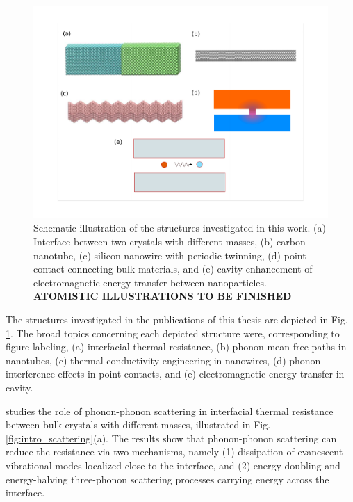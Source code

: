 \begin{figure}
\begin{center}
 \includegraphics[width=.99\columnwidth]{inkscape/systems.pdf}
 \caption{Schematic illustration of the structures investigated in this work. (a) Interface between two crystals with different masses, (b) carbon nanotube, (c) silicon nanowire with periodic twinning, (d) point contact connecting bulk materials, and (e) cavity-enhancement of electromagnetic energy transfer between nanoparticles. \textbf{ATOMISTIC ILLUSTRATIONS TO BE FINISHED}}
\label{fig:intro_structures}
\end{center}
\end{figure}

The structures investigated in the publications of this thesis are depicted in Fig. \ref{fig:intro_structures}. The broad topics concerning each depicted structure were, corresponding to figure labeling, (a) interfacial thermal resistance, (b) phonon mean free paths in nanotubes, (c) thermal conductivity engineering in nanowires, (d) phonon interference effects in point contacts, and (e) electromagnetic energy transfer in cavity. %

 studies the role of phonon-phonon scattering in interfacial thermal resistance between bulk crystals with different masses, illustrated in Fig. \ref{fig:intro_scattering}(a). The results show that phonon-phonon scattering can reduce the resistance via two mechanisms, namely (1) dissipation of evanescent vibrational modes localized close to the interface, and (2) energy-doubling and energy-halving three-phonon scattering processes carrying energy across the interface.  %

